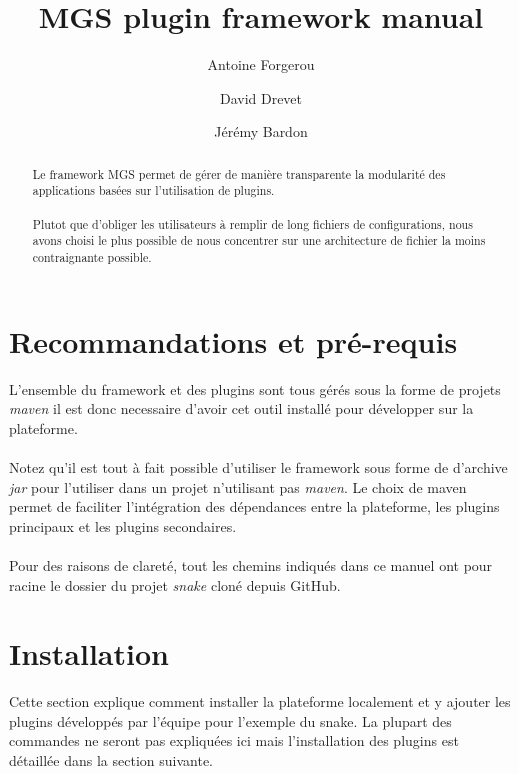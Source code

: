 \documentclass[12pt,a4paper]{article}
\title{MGS plugin framework manual}
\author{Antoine Forgerou \and David Drevet \and Jérémy Bardon}
\date{}
\begin{document}
	\renewcommand{\contentsname}{Sommaire}
	\renewcommand{\arraystretch}{1.8}
	\maketitle	
	
	\vspace{0.80cm}
	\tableofcontents	

	\thispagestyle{empty}	
	\setcounter{page}{0}
	\newpage
	
\begin{abstract}
Le framework MGS permet de gérer de manière transparente la modularité des 
applications basées sur l'utilisation de plugins. 
\\\\
Plutot que d'obliger les utilisateurs à remplir de long fichiers de configurations, 
nous avons choisi le plus possible de nous concentrer sur une architecture de 
fichier la moins contraignante possible.
\end{abstract}

\section{Recommandations et pré-requis}
L'ensemble du framework et des plugins sont tous gérés sous la forme de projets 
\emph{maven} il est donc necessaire d'avoir cet outil installé pour développer 
sur la plateforme.
\\\\
Notez qu'il est tout à fait possible d'utiliser le framework sous forme de d'archive 
\emph{jar} pour l'utiliser dans un projet n'utilisant pas \emph{maven}. Le choix de 
maven permet de faciliter l'intégration des dépendances entre la plateforme, les 
plugins principaux et les plugins secondaires.
\\\\
Pour des raisons de clareté, tout les chemins indiqués dans ce manuel ont pour racine 
le dossier du projet \emph{snake} cloné depuis GitHub.

\section{Installation}
Cette section explique comment installer la plateforme localement et y ajouter 
les plugins développés par l'équipe pour l'exemple du snake. La plupart des commandes 
ne seront pas expliquées ici mais l'installation des plugins est détaillée dans la 
section suivante.
\end{document}
